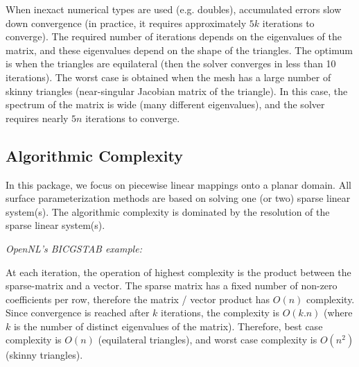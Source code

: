 When inexact numerical types are used (e.g. doubles), accumulated errors slow down convergence
(in practice, it requires approximately $5k$ iterations to converge).
The required number of iterations depends on the eigenvalues of the matrix, and these eigenvalues depend
on the shape of the triangles. The optimum is when the triangles are equilateral (then the solver converges
in less than 10 iterations). The worst case is obtained when the mesh has a large number of skinny triangles (near-singular Jacobian matrix of the triangle). In this case, the spectrum of the matrix
is wide (many different eigenvalues), and the solver requires nearly $5n$ iterations to converge.


\subsection{Algorithmic Complexity}

In this package, we focus on piecewise linear mappings onto a planar
domain. All surface parameterization methods are based on solving one (or two)
sparse linear system(s).
The algorithmic complexity is dominated by the resolution of the sparse linear system(s).

\emph{OpenNL's BICGSTAB example:}

At each iteration, the operation of highest complexity is the product between the sparse-matrix and a vector.
The sparse matrix has a fixed number of non-zero coefficients per row,
therefore the matrix / vector product has $O(n)$ complexity.
Since convergence is reached after $k$ iterations, the complexity is $O(k.n)$
(where $k$ is the number of distinct eigenvalues of the matrix).
Therefore, best case complexity is $O(n)$ (equilateral triangles),
and worst case complexity is $O(n^2)$ (skinny triangles).

